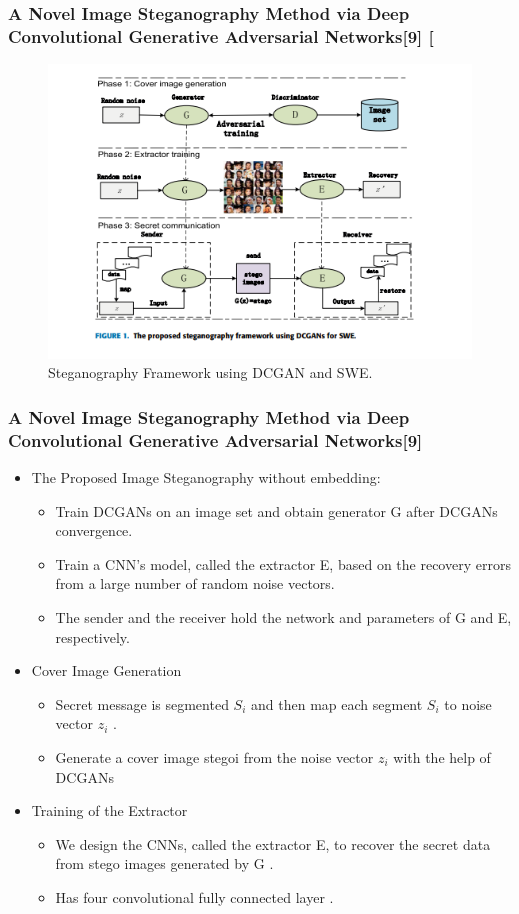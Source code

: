 \documentclass{beamer} %
\theoremstyle{definition} %
\begin{document}
\begin{frame}
\frametitle{A Novel Image Steganography Method via Deep Convolutional Generative Adversarial Networks[9] [ }
\begin{figure}
\includegraphics[scale=0.5]{DCGANSWE.png}
\caption{Steganography Framework using DCGAN and SWE.}
\end{figure}
\end{frame}
\begin{frame}
\frametitle{A Novel Image Steganography Method via Deep Convolutional Generative Adversarial Networks[9]}
\begin{itemize}
	\item The Proposed Image Steganography without embedding: 
	\begin{itemize}
		\item Train DCGANs on an image set and obtain generator G after DCGANs convergence.
		\item Train a CNN's model, called the extractor E, based on the recovery errors from a large number of random noise vectors. 
		\item The sender and the receiver hold the network and
		parameters of G and E, respectively. 
	\end{itemize}
   \item Cover Image Generation 
   \begin{itemize}
       \item Secret message is segmented $S_i$ and then map each segment $S_i$
       to noise vector $z_i$ .
       \item Generate a cover image stegoi from the noise vector $z_i$ with the help of DCGANs
   \end{itemize}
 \item Training of the Extractor
  \begin{itemize}
  	\item We design the CNNs, called the extractor E, to recover the
  	secret data from stego images generated by G .  
  	\item Has four convolutional fully connected layer . 
  \end{itemize}
\end{itemize}
\end{frame}
\end{document}

